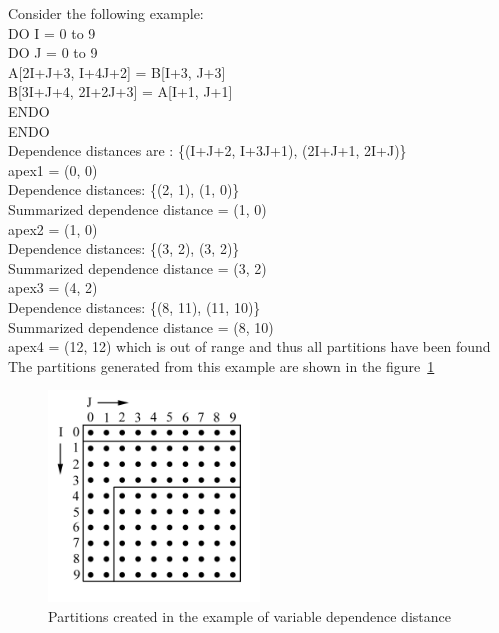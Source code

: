 \noindent Consider the following example: \\
DO I = 0 to 9 \\
\indent DO J = 0 to 9 \\
\indent \indent A[2I+J+3, I+4J+2] = B[I+3, J+3] \\
\indent \indent B[3I+J+4, 2I+2J+3] = A[I+1, J+1] \\
\indent ENDO \\
ENDO \\

\noindent Dependence distances are : \{(I+J+2, I+3J+1), (2I+J+1, 2I+J)\} \\

\noindent apex1 = (0, 0)\\
Dependence distances: \{(2, 1), (1, 0)\}\\
Summarized dependence distance = (1, 0)\\
apex2 = (1, 0)\\

\noindent Dependence distances: \{(3, 2), (3, 2)\}\\
Summarized dependence distance = (3, 2)\\
apex3 = (4, 2)\\

\noindent Dependence distances: \{(8, 11), (11, 10)\}\\
Summarized dependence distance = (8, 10)\\
apex4 = (12, 12) which is out of range and thus all partitions have been found\\

The partitions generated from this example are shown in the figure~\ref{fig:variable_eg}
\begin{figure}
\caption{Partitions created in the example of variable dependence distance}
\label{fig:variable_eg}
\centering \includegraphics[width=0.5\textwidth]{Figures/variable_eg.jpg}
\end{figure}